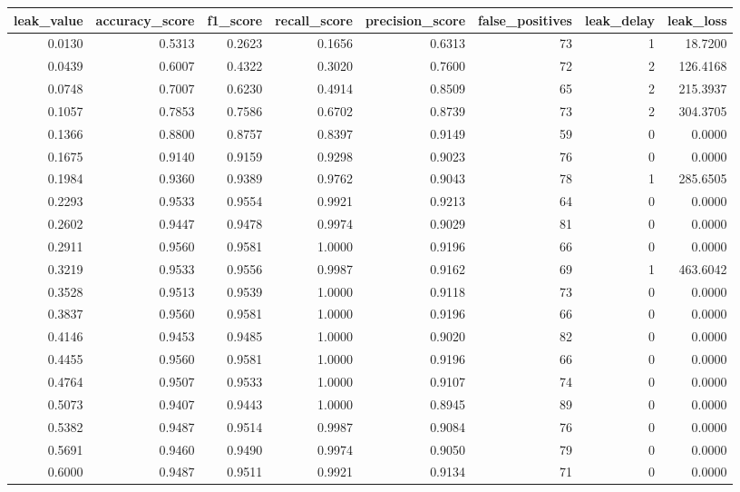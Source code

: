 \begin{tabular}{rrrrrrrr}
\toprule
leak\_value & accuracy\_score & f1\_score & recall\_score & precision\_score & false\_positives & leak\_delay & leak\_loss \\
\midrule
0.0130 & 0.5313 & 0.2623 & 0.1656 & 0.6313 & 73 & 1 & 18.7200 \\
0.0439 & 0.6007 & 0.4322 & 0.3020 & 0.7600 & 72 & 2 & 126.4168 \\
0.0748 & 0.7007 & 0.6230 & 0.4914 & 0.8509 & 65 & 2 & 215.3937 \\
0.1057 & 0.7853 & 0.7586 & 0.6702 & 0.8739 & 73 & 2 & 304.3705 \\
0.1366 & 0.8800 & 0.8757 & 0.8397 & 0.9149 & 59 & 0 & 0.0000 \\
0.1675 & 0.9140 & 0.9159 & 0.9298 & 0.9023 & 76 & 0 & 0.0000 \\
0.1984 & 0.9360 & 0.9389 & 0.9762 & 0.9043 & 78 & 1 & 285.6505 \\
0.2293 & 0.9533 & 0.9554 & 0.9921 & 0.9213 & 64 & 0 & 0.0000 \\
0.2602 & 0.9447 & 0.9478 & 0.9974 & 0.9029 & 81 & 0 & 0.0000 \\
0.2911 & 0.9560 & 0.9581 & 1.0000 & 0.9196 & 66 & 0 & 0.0000 \\
0.3219 & 0.9533 & 0.9556 & 0.9987 & 0.9162 & 69 & 1 & 463.6042 \\
0.3528 & 0.9513 & 0.9539 & 1.0000 & 0.9118 & 73 & 0 & 0.0000 \\
0.3837 & 0.9560 & 0.9581 & 1.0000 & 0.9196 & 66 & 0 & 0.0000 \\
0.4146 & 0.9453 & 0.9485 & 1.0000 & 0.9020 & 82 & 0 & 0.0000 \\
0.4455 & 0.9560 & 0.9581 & 1.0000 & 0.9196 & 66 & 0 & 0.0000 \\
0.4764 & 0.9507 & 0.9533 & 1.0000 & 0.9107 & 74 & 0 & 0.0000 \\
0.5073 & 0.9407 & 0.9443 & 1.0000 & 0.8945 & 89 & 0 & 0.0000 \\
0.5382 & 0.9487 & 0.9514 & 0.9987 & 0.9084 & 76 & 0 & 0.0000 \\
0.5691 & 0.9460 & 0.9490 & 0.9974 & 0.9050 & 79 & 0 & 0.0000 \\
0.6000 & 0.9487 & 0.9511 & 0.9921 & 0.9134 & 71 & 0 & 0.0000 \\
\bottomrule
\end{tabular}
